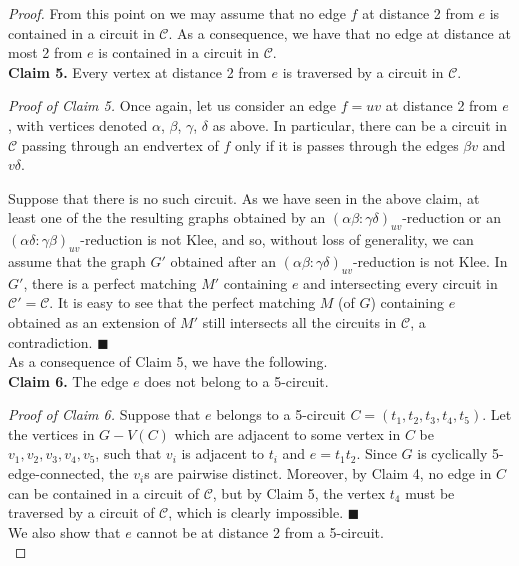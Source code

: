 \documentclass[]{theclass}
\begin{document}
\begin{proof}
From this point on we may assume that no edge $f$ at distance 2 from $e$ is contained in a circuit in $\mathcal{C}$. As a consequence, we have that no edge at distance at most 2 from $e$ is contained in a circuit in $\mathcal{C}$.\\

\noindent\textbf{Claim 5.} Every vertex at distance 2 from $e$ is traversed by a circuit in $\mathcal{C}$.

\noindent\emph{Proof of Claim 5.} Once again, let us consider an edge $f=uv$ at distance 2 from $e$, with vertices denoted $\alpha$, $\beta$, $\gamma$, $\delta$ as above. In particular, there can be a circuit in $\mathcal{C}$ passing through an endvertex of $f$ only if it is passes through the edges $\beta v$ and $v\delta$.

Suppose that there is no such circuit. As we have seen in the above claim, at least one of the the resulting graphs obtained by an $(\alpha\beta:\gamma\delta)_{uv}$-reduction or an $(\alpha\delta:\gamma\beta)_{uv}$-reduction is not Klee, and so, without loss of generality, we can assume that the graph $G'$ obtained after an $(\alpha\beta:\gamma\delta)_{uv}$-reduction is not Klee. In $G'$, there is a perfect matching $M'$ containing $e$ and intersecting every circuit in $\mathcal{C}'=\mathcal{C}$. It is easy to see that the perfect matching $M$ (of $G$) containing $e$ obtained as an extension of $M'$ still intersects all the circuits in $\mathcal{C}$, a contradiction. 
\hfill {\tiny$\blacksquare$}\\

As a consequence of Claim 5, we have the following.\\

\noindent\textbf{Claim 6.} The edge $e$ does not belong to a 5-circuit.

\noindent\emph{Proof of Claim 6.} Suppose that $e$ belongs to a 5-circuit $C=(t_1,t_2,t_3,t_4,t_5)$. Let the vertices in $G-V(C)$ which are adjacent to some vertex in $C$ be $v_1, v_2, v_3,v_4,v_5$, such that $v_i$ is adjacent to $t_i$ and $e=t_1t_2$. Since $G$ is cyclically 5-edge-connected, the $v_i$s are pairwise distinct. Moreover, by Claim 4, no edge in $C$ can be contained in a circuit of $\mathcal{C}$, but by Claim 5, the vertex $t_4$ must be traversed by a circuit of $\mathcal{C}$, which is clearly impossible. \hfill {\tiny$\blacksquare$}\\

We also show that $e$ cannot be at distance 2 from a 5-circuit.\\


\end{proof}
\end{document}

